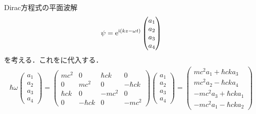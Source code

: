 \documentclass{report}
\begin{document}
Dirac方程式の平面波解
\begin{align}
  \psi = \mathrm{e}^{\mathrm{i}(kz - \omega t)}
  \begin{pmatrix}
    a_1\\a_2\\a_3\\a_4
  \end{pmatrix}
\end{align}
を考える．これをに代入する．
\begin{align}
  \hbar\omega
  \begin{pmatrix}
    a_1\\ a_2\\ a_3\\ a_4
  \end{pmatrix}
  =
  \begin{pmatrix}
    mc^2 & 0 & \hbar ck & 0\\
    0 & mc^2 & 0 & -\hbar ck \\
    \hbar ck & 0 & -mc^2 & 0\\
    0 & -\hbar ck & 0 & -mc^2
  \end{pmatrix}
  \begin{pmatrix}
    a_1\\a_2\\a_3\\a_4
  \end{pmatrix}
  =
  \begin{pmatrix}
    mc^2 a_1 + \hbar c k a_3\\
    mc^2 a_2 - \hbar c k a_4\\
    -mc^2 a_3 + \hbar c k a_1\\
    -mc^2 a_1 - \hbar c k a_2
  \end{pmatrix}
\end{align}
\end{document}
